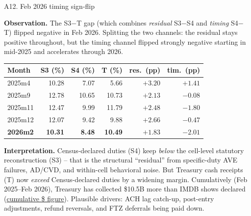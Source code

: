 \documentclass[aspectratio=169,10pt]{beamer}
\begin{document}
\begin{frame}{A12. Feb 2026 timing sign-flip}
\hypertarget{appendix_signflip}{}

\small

\textbf{Observation.} The S3$-$T gap (which combines \emph{residual} S3$-$S4 and \emph{timing} S4$-$T) flipped negative in Feb 2026. Splitting the two channels: the residual stays positive throughout, but the timing channel flipped strongly negative starting in mid-2025 and accelerates through 2026.

\begin{center}
\begin{tabular}{l r r r r r}
\toprule
Month & S3 (\%) & S4 (\%) & T (\%) & res.\ (pp) & tim.\ (pp) \\
\midrule
2025m4  & 10.28 &  7.07 &  5.66 & $+3.20$ & $+1.41$ \\
2025m9  & 12.78 & 10.65 & 10.73 & $+2.13$ & $-0.08$ \\
2025m11 & 12.47 &  9.99 & 11.79 & $+2.48$ & $-1.80$ \\
2025m12 & 12.07 &  9.42 &  9.88 & $+2.66$ & $-0.47$ \\
\textbf{2026m2}  & \textbf{10.31} & \textbf{8.48} & \textbf{10.49} & \textbf{$+1.83$} & \textbf{$-2.01$} \\
\bottomrule
\end{tabular}
\end{center}

\textbf{Interpretation.} Census-declared duties (S4) keep \emph{below} the cell-level statutory reconstruction (S3) -- that is the structural ``residual'' from specific-duty AVE failures, AD/CVD, and within-cell behavioral noise. But Treasury cash receipts (T) now \emph{exceed} Census-declared duties by a widening margin. Cumulatively (Feb 2025--Feb 2026), Treasury has collected \alert{\$10.5B more} than IMDB shows declared (\hyperlink{appendix_cumduty}{cumulative \$ figure}). Plausible drivers: ACH lag catch-up, post-entry adjustments, refund reversals, and FTZ deferrals being paid down.

\end{frame}
\end{document}
